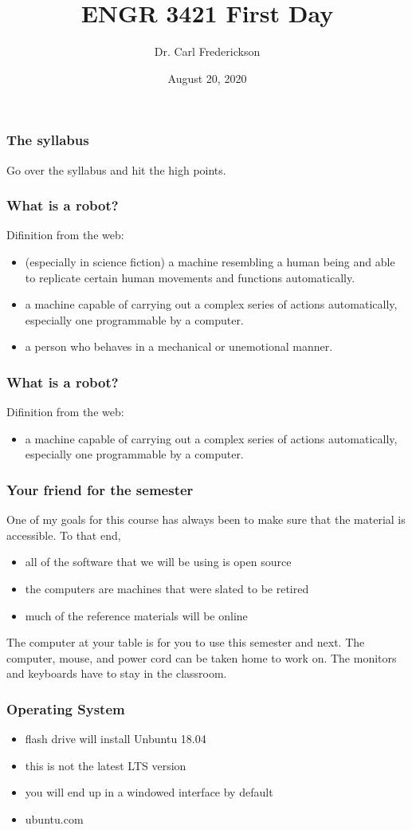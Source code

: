 \documentclass[12pt,letterpaper]{beamer}
\title{ENGR 3421 First Day}
\author{Dr. Carl Frederickson}
\institute{UCA, Physics and Astronomy}
\date{August 20, 2020}
\begin{document}
\frame{\titlepage}

\begin{frame}
	\frametitle{The syllabus}
	Go over the syllabus and hit the high points.
\end{frame}

\begin{frame}
	\frametitle{What is a robot?}
	Difinition from the web:
	\begin{itemize}
		\item<1-> (especially in science fiction) a machine resembling a human being and able to replicate certain human movements and functions automatically.
		\item<2-> a machine capable of carrying out a complex series of actions automatically, especially one programmable by a computer.
		\item<3-> a person who behaves in a mechanical or unemotional manner.
	\end{itemize}
\end{frame}

\begin{frame}
	\frametitle{What is a robot?}
	Difinition from the web:
	\begin{itemize}
		\item a machine capable of carrying out a complex series of actions automatically, especially one programmable by a computer.
	\end{itemize}
\end{frame}

\begin{frame}
	\frametitle{Your friend for the semester}
	One of my goals for this course has always been to make sure that the material is accessible. To that end, 
	\begin{itemize}
		\item all of the software that we will be using is open source
		\item the computers are machines that were slated to be retired
		\item much of the reference materials will be online
	\end{itemize}
	The computer at your table is for you to use this semester and next. The computer, mouse, and power cord can be taken home to work on. The monitors and keyboards have to stay in the classroom.
\end{frame}

\begin{frame}
	\frametitle{Operating System}
	\begin{itemize}
		\item<1-> flash drive will install Unbuntu 18.04
		\item<2-> this is not the latest LTS version 
		\item<3-> you will end up in a windowed interface by default
		\item<4-> ubuntu.com
	\end{itemize}
\end{frame}
\end{document}
